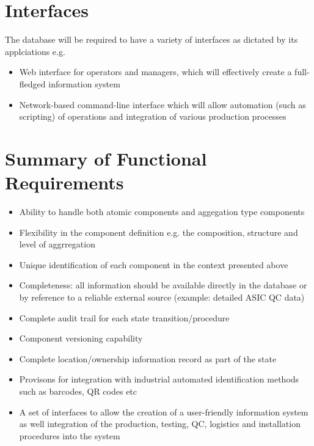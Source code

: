 \documentclass[pdftex,12pt,letter]{article}
\begin{document}
\section{Interfaces}

The database will be required to have a variety of interfaces as dictated by its applciations e.g.

\begin{itemize}

\item Web interface for operators and managers, which will effectively create a full-fledged information system

\item Network-based command-line interface which will allow automation (such as scripting) of operations
and integration of various production processes

\end{itemize}


\section{Summary of Functional Requirements}

\begin{itemize}

\item Ability to handle both atomic components and aggegation type components

\item Flexibility in the component definition e.g. the composition, structure and level of aggrregation

\item Unique identification of each component in the context presented above

\item Completeness: all information should be available directly in the database or by reference to a reliable external source
(example: detailed ASIC QC data)

\item Complete audit trail for each state transition/procedure

\item Component versioning capability

\item Complete location/ownership information record as part of the state

\item Provisons for integration with industrial automated identification methods such as barcodes, QR codes etc

\item A set of interfaces to allow the creation of a user-friendly information system as well integration of the production, testing, QC,
logistics and installation procedures into the system

\end{itemize}
\end{document}
